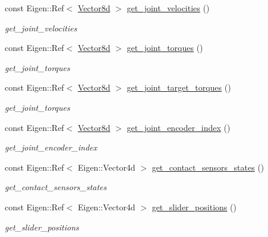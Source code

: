 \begin{DoxyCompactItemize}
const Eigen\+::\+Ref$<$ \hyperlink{common__header_8hpp_a98975ffbe0bca1296078e0350dfedd60}{Vector8d} $>$ \hyperlink{classblmc__robots_1_1Solo8_a2e27aa306a9f2a1812274156314eed9b}{get\+\_\+joint\+\_\+velocities} ()
\begin{DoxyCompactList}\small\item\em get\+\_\+joint\+\_\+velocities \end{DoxyCompactList}\item 
const Eigen\+::\+Ref$<$ \hyperlink{common__header_8hpp_a98975ffbe0bca1296078e0350dfedd60}{Vector8d} $>$ \hyperlink{classblmc__robots_1_1Solo8_a31b0684570b478967034513a4ade8031}{get\+\_\+joint\+\_\+torques} ()
\begin{DoxyCompactList}\small\item\em get\+\_\+joint\+\_\+torques \end{DoxyCompactList}\item 
const Eigen\+::\+Ref$<$ \hyperlink{common__header_8hpp_a98975ffbe0bca1296078e0350dfedd60}{Vector8d} $>$ \hyperlink{classblmc__robots_1_1Solo8_ac18587cbf727c3da1432f1baea9c7e2a}{get\+\_\+joint\+\_\+target\+\_\+torques} ()
\begin{DoxyCompactList}\small\item\em get\+\_\+joint\+\_\+torques \end{DoxyCompactList}\item 
const Eigen\+::\+Ref$<$ \hyperlink{common__header_8hpp_a98975ffbe0bca1296078e0350dfedd60}{Vector8d} $>$ \hyperlink{classblmc__robots_1_1Solo8_ad9de077a2752f30109afeea1c97e77a6}{get\+\_\+joint\+\_\+encoder\+\_\+index} ()
\begin{DoxyCompactList}\small\item\em get\+\_\+joint\+\_\+encoder\+\_\+index \end{DoxyCompactList}\item 
const Eigen\+::\+Ref$<$ Eigen\+::\+Vector4d $>$ \hyperlink{classblmc__robots_1_1Solo8_a2a93ab10811f7425de07ccc44ec2cc07}{get\+\_\+contact\+\_\+sensors\+\_\+states} ()
\begin{DoxyCompactList}\small\item\em get\+\_\+contact\+\_\+sensors\+\_\+states \end{DoxyCompactList}\item 
const Eigen\+::\+Ref$<$ Eigen\+::\+Vector4d $>$ \hyperlink{classblmc__robots_1_1Solo8_ab63c523c0215a19f3a27fba33b4055c0}{get\+\_\+slider\+\_\+positions} ()
\begin{DoxyCompactList}\small\item\em get\+\_\+slider\+\_\+positions \end{DoxyCompactList}\item 

\end{DoxyCompactItemize}
